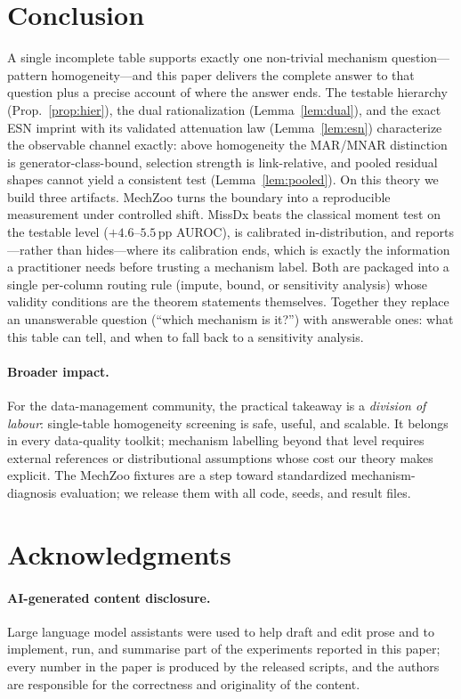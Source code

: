 \documentclass[conference]{IEEEtran}
\begin{document}
\section{Conclusion}
A single incomplete table supports exactly one non-trivial mechanism question---pattern
homogeneity---and this paper delivers the complete answer to that question plus a precise
account of where the answer ends. The testable hierarchy (Prop.~\ref{prop:hier}), the dual
rationalization (Lemma~\ref{lem:dual}), and the exact ESN imprint with its validated
attenuation law (Lemma~\ref{lem:esn}) characterize the observable channel exactly: above
homogeneity the MAR/MNAR distinction is generator-class-bound, selection strength is
link-relative, and pooled residual shapes cannot yield a consistent test
(Lemma~\ref{lem:pooled}). On this theory we build three artifacts. MechZoo turns the
boundary into a reproducible measurement under controlled shift. MissDx beats the classical
moment test on the testable level ($+4.6$--$5.5$\,pp AUROC), is calibrated in-distribution,
and reports---rather than hides---where its calibration ends, which is exactly the
information a practitioner needs before trusting a mechanism label. Both are packaged into a single per-column routing rule (impute, bound, or sensitivity
analysis) whose validity conditions are the theorem statements themselves. Together they replace an
unanswerable question (``which mechanism is it?'') with answerable ones: what this table can
tell, and when to fall back to a sensitivity analysis.

\paragraph{Broader impact.} For the data-management community, the practical takeaway is
a \emph{division of labour}: single-table homogeneity screening is safe, useful, and
scalable. It belongs in every data-quality toolkit; mechanism labelling beyond that level
requires external references or distributional assumptions whose cost our theory makes
explicit. The MechZoo fixtures are a step toward
standardized mechanism-diagnosis evaluation; we release them with all code, seeds,
and result files.

\section*{Acknowledgments}
\paragraph{AI-generated content disclosure.} Large language model assistants were used to
help draft and edit prose and to implement, run, and summarise part of the experiments
reported in this paper; every number in the paper is produced by the released scripts, and
the authors are responsible for the correctness and originality of the content.
\end{document}
